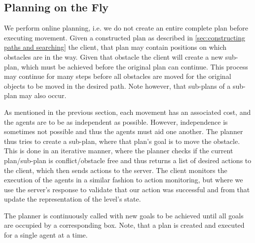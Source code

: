 \subsection{Planning on the Fly}
\label{sec:planning on the fly}

We perform online planning, i.e. we do not create an entire complete plan before executing movement.
Given a constructed plan as described in \cref{sec:constructing paths and searching} the client, that plan may contain positions on which obstacles are in the way.
Given that obstacle the client will create a new sub-plan, which must be achieved before the original plan can continue.
This process may continue for many steps before all obstacles are moved for the original objects to be moved in the desired path.
Note however, that sub-plans of a sub-plan may also occur.

As mentioned in the previous section, each movement has an associated cost, and the agents are to be as independent as possible.
However, independence is sometimes not possible and thus the agents must aid one another.
The planner thus tries to create a sub-plan, where that plan's goal is to move the obstacle.
This is done in an iterative manner, where the planner checks if the current plan/sub-plan is conflict/obstacle free and thus returns a list of desired actions to the client, which then sends actions to the server.
The client monitors the execution of the agents in a similar fashion to action monitoring, but where we use the server's response to validate that our action was successful and from that update the representation of the level's state.

The planner is continuously called with new goals to be achieved until all goals are occupied by a corresponding box.
Note, that a plan is created and executed for a single agent at a time.
